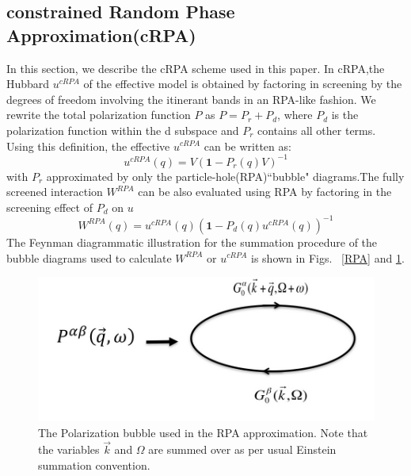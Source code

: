 \documentclass[10pt]{ruthesis}
\begin{document}
{\subsection{constrained Random Phase Approximation(cRPA)}
In this section, we describe the cRPA scheme used in this paper. In cRPA\cite{PRB_lowenegymodel_for_firstprincilpes__2004_F.Ary},the Hubbard $u^{cRPA}$ of the effective model is obtained by factoring in screening by the degrees of freedom involving the itinerant bands in an RPA-like fashion. We rewrite the total polarization function $P$ as $P=P_r+P_d$, where $P_d$ is the polarization function within the d subspace and $P_r$  contains all other terms. Using this definition, the effective $u^{cRPA}$ can be written as:
\begin{equation}
u^{cRPA}(q)=V(\mathbf{1}-P_r(q)V)^{-1} \label{cRPA Eq}
\end{equation}
with $P_r$ approximated by only the particle-hole(RPA)``bubble" diagrams.The fully screened interaction $W^{RPA}$ can be also evaluated using RPA by factoring in the screening effect of $P_d$ on $u$
\begin{equation}\label{W_def}
W^{RPA}(q)=u^{cRPA}(q)(\mathbf{1}-P_d(q)u^{cRPA}(q))^{-1}
\end{equation} 
The Feynman diagrammatic  illustration for the summation procedure of the bubble diagrams used to calculate $W^{RPA}$ or $u^{cRPA}$ is shown in Figs. ~\ref{RPA} and \ref{Polar}.

\begin{figure}[H]
\begin{center}
 \includegraphics[width=0.6\columnwidth]{Polarization_bubble.jpg}
 \caption{\label{Polar} The Polarization bubble used in the RPA approximation. Note that the variables $\vec{k}$ and $\Omega$ are summed over as per usual Einstein summation convention.}
\end{center}
\end{figure}



}
\end{document}
